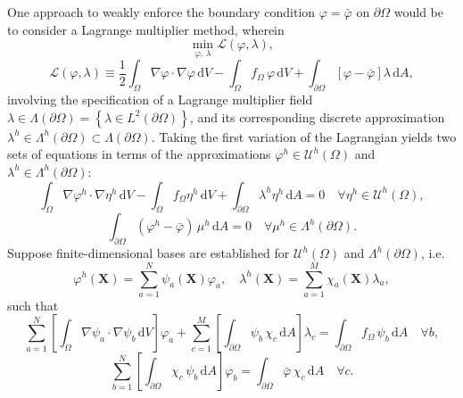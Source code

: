 	One approach to weakly enforce the boundary condition $\varphi = \bar{\varphi}$ on $\partial \Omega$ would be to consider a Lagrange multiplier method, wherein
	\begin{equation}
		\min_{\varphi, \, \lambda} \mathcal{L}(\varphi,\lambda),
	\end{equation}
	\begin{equation}
	\mathcal{L}(\varphi,\lambda) \equiv \frac{1}{2} \int_{\Omega} \nabla \varphi \cdot \nabla \varphi \, \mathrm dV - \int_{\Omega} f_{\Omega} \, \varphi \, \mathrm dV + \int_{\partial \Omega} \left[ \varphi - \bar{\varphi} \right] \lambda \, \mathrm dA,
\end{equation}
	involving the specification of a Lagrange multiplier field $\lambda \in \Lambda (\partial \Omega) = \left\{ \lambda \in L^2 (\partial \Omega) \right\}$, and its corresponding discrete approximation $\lambda^h \in \Lambda^h (\partial \Omega) \subset \Lambda (\partial \Omega)$. Taking the first variation of the Lagrangian yields two sets of equations in terms of the approximations $\varphi^h \in \mathcal{U}^h (\Omega)$ and $\lambda^h \in \Lambda^h (\partial \Omega)$:
	\begin{equation}
		\int_{\Omega} \nabla \varphi^h \cdot \nabla \eta^h \, \mathrm dV - \int_\Omega f_\Omega \eta^h \, \mathrm dV + \int_{\partial \Omega} \lambda^h \eta^h \, \mathrm dA = 0 \quad \forall \eta^h \in \mathcal{U}^h (\Omega),
	\end{equation}
	\begin{equation}
		\int_{\partial \Omega} (\varphi^h - \bar{\varphi}) \, \mu^h \, \mathrm dA = 0 \quad \forall \mu^h \in \Lambda^h (\partial \Omega).
	\end{equation}
	Suppose finite-dimensional bases are established for $\mathcal{U}^h (\Omega)$ and $\Lambda^h (\partial \Omega)$, i.e.
\begin{equation}
	\varphi^h (\bm{X}) = \sum_{a=1}^{N} \psi_a (\bm{X}) \varphi_a, \quad \lambda^h (\bm{X}) = \sum_{a=1}^{M} \chi_a (\bm{X}) \lambda_a,
\end{equation}
such that
\begin{equation}
	\sum_{a=1}^N \left[ \int_{\Omega} \nabla \psi_a \cdot \nabla \psi_b \, \mathrm dV \right] \varphi_a + \sum_{c=1}^M \left[ \int_{\partial \Omega} \psi_b \, \chi_c \, \mathrm dA \right] \lambda_c = \int_{\partial \Omega} f_\Omega \, \psi_b \, \mathrm dA \quad \forall b,
\end{equation}
\begin{equation}
	\sum_{b=1}^N \left[ \int_{\partial \Omega} \chi_c \, \psi_b \, \mathrm dA \right] \varphi_b = \int_{\partial \Omega} \bar{\varphi} \, \chi_c \, \mathrm dA \quad \forall c.
\end{equation}
